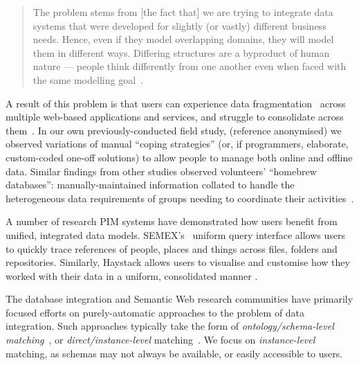\documentclass{sigchi}
\begin{document}
\begin{quote} 
The problem stems from [the fact that] we are trying to integrate data systems that were developed for slightly (or vastly) different business needs. Hence, even if they model overlapping domains, they will model them in different ways. Differing structures are a byproduct of human nature --- people think differently from one another even when faced with the same modelling goal~\cite{halevy2006data}.
\end{quote}

A result of this problem is that users can experience data fragmentation~\cite{Jones05towardsa} across multiple web-based applications and services, and struggle to consolidate across them~\cite{bergman,boardmansasse}.  In our own previously-conducted field study, (reference anonymised) we observed variations of manual ``coping strategies'' (or, if programmers, elaborate, custom-coded one-off solutions) to allow people to manage both online and offline data.  Similar findings from other studies observed volunteers' ``homebrew databases'': manually-maintained information collated to handle the heterogeneous data requirements of groups needing to coordinate their activities~\cite{Voida:2011:HDC:1978942.1979078}.

A number of research PIM systems have demonstrated how users benefit from unified, integrated data models.  SEMEX's~\cite{semex} uniform query interface allows users to quickly trace references of people, places and things across files, folders and repositories.  Similarly, Haystack  allows users to visualise and customise how they worked with their data in a uniform, consolidated manner \cite{haystack}. 

The database integration and Semantic Web \cite{Shadbolt:2006:SWR:1155313.1155373} research communities have primarily focused efforts on purely-automatic approaches to the problem of data integration.  Such approaches typically take the form of \emph{ontology/schema-level matching}~\cite{euzenat2004api,doan2003learning}, or \emph{direct/instance-level} matching~\cite{suchanek2011paris,castano2006matching}.  We focus on \emph{instance-level} matching, as schemas may not always be available, or easily accessible to users.
\end{document}
